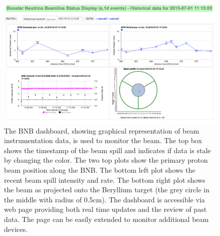 \begin{figure}[htb]
\centering	
\includegraphics[width=0.95\linewidth]{figures/beam_monitoring.png}
\caption{The BNB dashboard, showing graphical representation of beam instrumentation data, is used to monitor the beam. The top box shows the timestamp of the beam spill and indicates if data is stale by changing the color. The two top plots show the primary proton beam position along the BNB. The bottom left plot shows the recent beam spill intensity and rate. The bottom right plot shows the beam as projected onto the Beryllium target (the grey circle in the middle with radius of 0.5cm). The dashboard is accessible via web page providing both real time updates and the review of past data. The page can be easily extended to monitor additional beam devices.}
\label{fig:beammonitor}
\end{figure}


